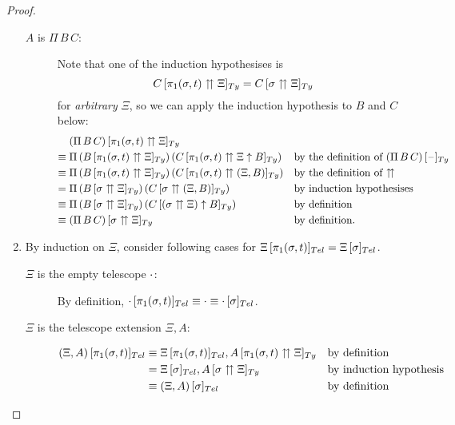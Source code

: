 \documentclass[a4paper,UKenglish,numberwithinsect,cleveref,thm-restate]{lipics-v2021}
\begin{document}
\begin{proof}
\begin{enumerate}
\begin{description}
        \item[$A$ is $\Pi\,B\,C$:]
          Note that one of the induction hypothesises is
          \[
            \subTy{C}{\pi_1(\sigma, t) \upuparrows \Xi} = \subTy{C}{\sigma \upuparrows \Xi}
          \]
          for \emph{arbitrary} $\Xi$, so we can apply the induction hypothesis to $B$ and $C$ below:
          \begin{align*}
            & \subTy{(\Pi\,B\,C)}{\pi_1(\sigma, t) \upuparrows \Xi} \\
            \judgeq{} & \Pi\,(\subTy{B}{\pi_1(\sigma, t) \upuparrows \Xi})\,(\subTy{C}{\pi_1(\sigma, t) \upuparrows \Xi \uparrow B}) && \text{by the definition of $\subTy{(\Pi\,B\,C)}{\blank}$} \\
            \judgeq{} & \Pi\,(\subTy{B}{\pi_1(\sigma, t) \upuparrows \Xi})\,(\subTy{C}{\pi_1(\sigma, t) \upuparrows (\Xi, B)}) && \text{by the definition of $\upuparrows$} \\
            ={}       & \Pi\,(\subTy{B}{\sigma \upuparrows \Xi})\,(\subTy{C}{\sigma \upuparrows (\Xi, B)}) && \text{by induction hypothesises} \\
            \judgeq{} & \Pi\,(\subTy{B}{\sigma \upuparrows \Xi})\,(\subTy{C}{(\sigma \upuparrows \Xi) \uparrow B}) && \text{by definition} \\
            \judgeq{} & \subTy{(\Pi\,B\,C)}{\sigma\upuparrows \Xi} && \text{by definition.}
          \end{align*}
      \end{description}
    \item By induction on $\Xi$, consider following cases for $\subTel{\Xi}{\pi_1(\sigma, t)} = \subTel{\Xi}{\sigma}$.
      \begin{description}
        \item[$\Xi$ is the empty telescope $\cdot$:] By definition, $\subTel{\emptytel}{\pi_1(\sigma, t)} \judgeq \emptytel \judgeq \subTel{\emptytel}{\sigma}$.
        \item[$\Xi$ is the telescope extension $\Xi, A$:]
          \begin{align*}
            \subTel{(\Xi, A)}{\pi_1(\sigma, t)} & \judgeq \subTel{\Xi}{\pi_1(\sigma, t)}, \subTy{A}{\pi_1(\sigma, t) \upuparrows \Xi} && \text{by definition} \\
                                                & = \subTel{\Xi}{\sigma}, \subTy{A}{\sigma \upuparrows \Xi} && \text{by induction hypothesis} \\
                                                & \judgeq \subTel{(\Xi, A)}{\sigma} && \text{by definition}

\end{align*}
\end{description}
\end{enumerate}
\end{proof}
\end{document}
